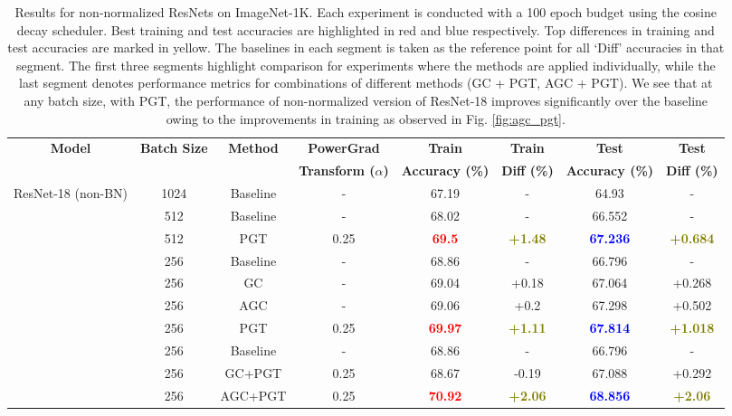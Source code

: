 \documentclass[times,sort&compress]{elsarticle}
\begin{document}
\begin{table}[!t]
\centering
\caption{ Results for non-normalized ResNets on ImageNet-1K. Each experiment is
conducted with a 100 epoch budget using the cosine decay scheduler. Best training and
test accuracies are highlighted in red and blue respectively. Top differences in
training and test accuracies are marked in yellow. The baselines in each segment is
taken as the reference point for all `Diff' accuracies in that segment. The first three
segments highlight comparison for experiments where the methods are applied
individually, while the last segment denotes performance metrics for combinations of
different methods (GC + PGT, AGC + PGT). We see that at any batch size, with PGT, the
performance of non-normalized version of ResNet-18 improves significantly over the
baseline owing to the improvements in training as observed in Fig. \ref{fig:agc_pgt}. }
\label{tab:wobn_table}
\begin{tabular}{cccccccc}
\multirow{2}{*}{\textbf{Model}} & \multirow{2}{*}{\textbf{Batch Size}} &
\multirow{2}{*}{\textbf{Method}} & \textbf{PowerGrad} & \textbf{\hspace{-0.65cm} Train}
& \textbf{Train} & \textbf{\hspace{-0.65cm} Test} & \textbf{Test} \\
& & & \textbf{Transform ($\alpha$)} & \textbf{Accuracy (\%)} & \textbf{Diff (\%)} &
\textbf{Accuracy (\%)} & \textbf{Diff (\%)} \\
\midrule
ResNet-18 (non-BN) & 1024 & Baseline & - & 67.19 & - & 64.93 & - \\
\cmidrule{2-8}
& 512 & Baseline & - & 68.02 & - & 66.552 & - \\
& 512 & PGT & 0.25 & \textcolor{red}{\textbf{69.5}} & \textcolor{olive}{\textbf{+1.48}} &
\textcolor{blue}{\textbf{67.236}} & \textcolor{olive}{\textbf{+0.684}} \\
\cmidrule{2-8}
& 256 & Baseline & - & 68.86 & - & 66.796 & - \\
& 256 & GC & - & 69.04 & +0.18 & 67.064 & +0.268 \\
& 256 & AGC & - & 69.06 & +0.2 & 67.298 & +0.502 \\
& 256 & PGT & 0.25 & \textcolor{red}{\textbf{69.97}} & \textcolor{olive}{\textbf{+1.11}} &
\textcolor{blue}{\textbf{67.814}} & \textcolor{olive}{\textbf{+1.018}} \\
\cmidrule{2-8}
& 256 & Baseline & - & 68.86 & - & 66.796 & - \\
& 256 & GC+PGT & 0.25 & 68.67 & -0.19 & 67.088 & +0.292 \\
& 256 & AGC+PGT & 0.25 & \textcolor{red}{\textbf{70.92}} & \textcolor{olive}{\textbf{+2.06}} &
\textcolor{blue}{\textbf{68.856}} & \textcolor{olive}{\textbf{+2.06}} \\
\end{tabular}
\end{table}
\end{document}
